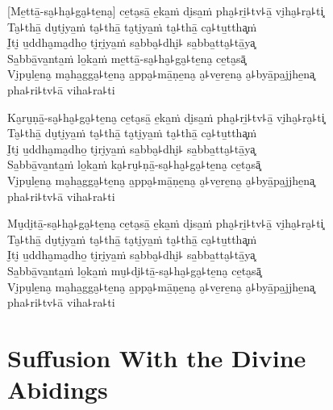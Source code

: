 \begin{leader}
\end{leader}

[Me̱ttā̱-sa̮꜕ha̮꜕ga̮꜕te̱na̮] ce̱ta̮sā̱ e̱ka̱ṁ di̮sa̱ṁ pha̮꜕ri̱꜕tv꜕ā̱ vi̮ha̮꜕ra̮꜕ti͓\\
Ta̮꜕thā̱ du̮ti̮ya̱ṁ ta̮꜕thā̱ ta̮ti̮ya̱ṁ ta̮꜕thā̱ ca̮꜕tu̱ttha͓ṁ\\
I̮ti̮ u̱ddha̮ma̮dho̱ ti̮ri̮ya̱ṁ sa̱bba̮꜕dhi̮꜕ sa̱bba̱tta̮꜕tā̱ya͓\\
Sa̱bbā̱va̱nta̱ṁ lo̱ka̱ṁ me̱ttā̱-sa̮꜕ha̮꜕ga̮꜕te̱na̮ ce̱ta̮sā͓\\
Vi̮pu̮le̱na̮ ma̮ha̱gga̮꜕te̱na̮ a̱ppa̮꜕mā̱ṇe̱na̮ a̮꜕ve̱re̱na̮ a̮꜕byā̱pa̱jjhe̱na͓\\
\vin pha꜕ri꜕tv꜕ā viha꜕ra꜕ti

Ka̮ru̮ṇā̱-sa̮꜕ha̮꜕ga̮꜕te̱na̮ ce̱ta̮sā̱ e̱ka̱ṁ di̮sa̱ṁ pha̮꜕ri̱꜕tv꜕ā̱ vi̮ha̮꜕ra̮꜕ti͓\\
Ta̮꜕thā̱ du̮ti̮ya̱ṁ ta̮꜕thā̱ ta̮ti̮ya̱ṁ ta̮꜕thā̱ ca̮꜕tu̱ttha͓ṁ\\
I̮ti̮ u̱ddha̮ma̮dho̱ ti̮ri̮ya̱ṁ sa̱bba̮꜕dhi̮꜕ sa̱bba̱tta̮꜕tā̱ya͓\\
Sa̱bbā̱va̱nta̱ṁ lo̱ka̱ṁ ka̮꜕ru̮꜕ṇā̱-sa̮꜕ha̮꜕ga̮꜕te̱na̮ ce̱ta̮sā͓\\
Vi̮pu̮le̱na̮ ma̮ha̱gga̮꜕te̱na̮ a̱ppa̮꜕mā̱ṇe̱na̮ a̮꜕ve̱re̱na̮ a̮꜕byā̱pa̱jjhe̱na͓\\
\vin pha꜕ri꜕tv꜕ā viha꜕ra꜕ti

Mu̮di̮tā̱-sa̮꜕ha̮꜕ga̮꜕te̱na̮ ce̱ta̮sā̱ e̱ka̱ṁ di̮sa̱ṁ pha̮꜕ri̱꜕tv꜕ā̱ vi̮ha̮꜕ra̮꜕ti͓\\
Ta̮꜕thā̱ du̮ti̮ya̱ṁ ta̮꜕thā̱ ta̮ti̮ya̱ṁ ta̮꜕thā̱ ca̮꜕tu̱ttha͓ṁ\\
I̮ti̮ u̱ddha̮ma̮dho̱ ti̮ri̮ya̱ṁ sa̱bba̮꜕dhi̮꜕ sa̱bba̱tta̮꜕tā̱ya͓\\
Sa̱bbā̱va̱nta̱ṁ lo̱ka̱ṁ mu̮꜕di̮꜕tā̱-sa̮꜕ha̮꜕ga̮꜕te̱na̮ ce̱ta̮sā͓\\
Vi̮pu̮le̱na̮ ma̮ha̱gga̮꜕te̱na̮ a̱ppa̮꜕mā̱ṇe̱na̮ a̮꜕ve̱re̱na̮ a̮꜕byā̱pa̱jjhe̱na͓\\
\vin pha꜕ri꜕tv꜕ā viha꜕ra꜕ti

\chapter[Divine Abidings]{Suffusion With the Divine Abidings}


\begin{leader}
\end{leader}

